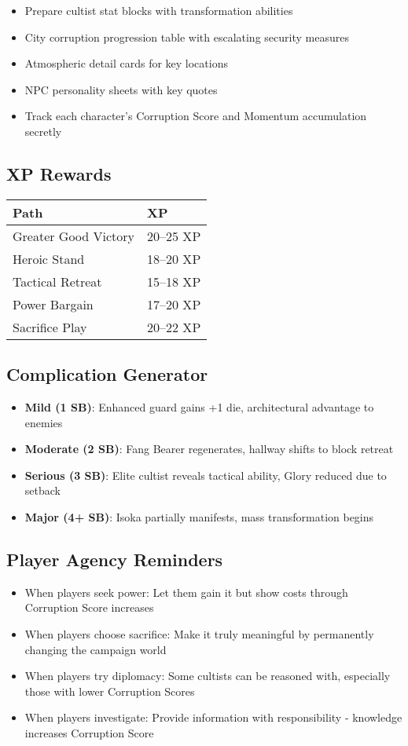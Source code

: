 \documentclass[11pt]{article}
\begin{document}
\begin{itemize}[leftmargin=*]
    \item Prepare cultist stat blocks with transformation abilities
    \item City corruption progression table with escalating security measures
    \item Atmospheric detail cards for key locations
    \item NPC personality sheets with key quotes
    \item Track each character's Corruption Score and Momentum accumulation secretly
\end{itemize}

\subsection{XP Rewards}
\begin{tabular}{|p{4cm}|p{3cm}|}
\hline
\textbf{Path} & \textbf{XP} \\
\hline
Greater Good Victory & 20--25 XP \\
\hline
Heroic Stand & 18--20 XP \\
\hline
Tactical Retreat & 15--18 XP \\
\hline
Power Bargain & 17--20 XP \\
\hline
Sacrifice Play & 20--22 XP \\
\hline
\end{tabular}

\subsection{Complication Generator}
\begin{itemize}[leftmargin=*]
    \item \textbf{Mild (1 SB)}: Enhanced guard gains +1 die, architectural advantage to enemies
    \item \textbf{Moderate (2 SB)}: Fang Bearer regenerates, hallway shifts to block retreat
    \item \textbf{Serious (3 SB)}: Elite cultist reveals tactical ability, Glory reduced due to setback
    \item \textbf{Major (4+ SB)}: Isoka partially manifests, mass transformation begins
\end{itemize}

\subsection{Player Agency Reminders}
\begin{itemize}[leftmargin=*]
    \item When players seek power: Let them gain it but show costs through Corruption Score increases
    \item When players choose sacrifice: Make it truly meaningful by permanently changing the campaign world
    \item When players try diplomacy: Some cultists can be reasoned with, especially those with lower Corruption Scores
    \item When players investigate: Provide information with responsibility - knowledge increases Corruption Score
\end{itemize}
\end{document}
